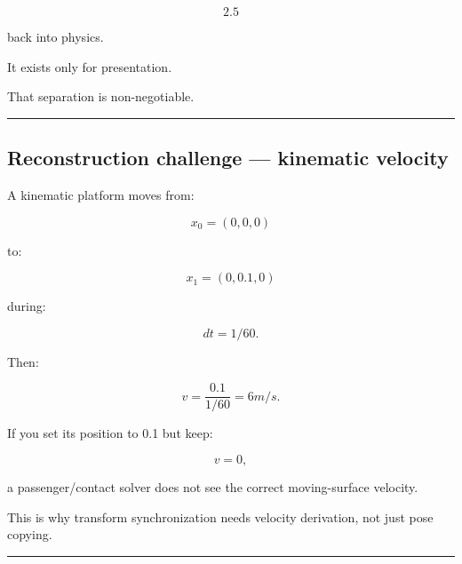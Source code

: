 \[
2.5
\]

back into physics.

It exists only for presentation.

That separation is non-negotiable.

\begin{center}\rule{0.5\linewidth}{0.5pt}\end{center}

\subsection{Reconstruction challenge --- kinematic velocity}\label{06-engine-ii-ch038-reconstruction-challenge-kinematic-velocity}

\hypertarget{06-engine-ii-ch038-reconstruction-challenge-kinematic-velocity}{}

A kinematic platform moves from:

\[
x_0=(0,0,0)
\]

to:

\[
x_1=(0,0.1,0)
\]

during:

\[
dt=1/60.
\]

Then:

\[
v
=
\frac{0.1}{1/60}
=
6m/s.
\]

If you set its position to 0.1 but keep:

\[
v=0,
\]

a passenger/contact solver does not see the correct moving-surface velocity.

This is why transform synchronization needs velocity derivation, not just pose copying.

\begin{center}\rule{0.5\linewidth}{0.5pt}\end{center}

